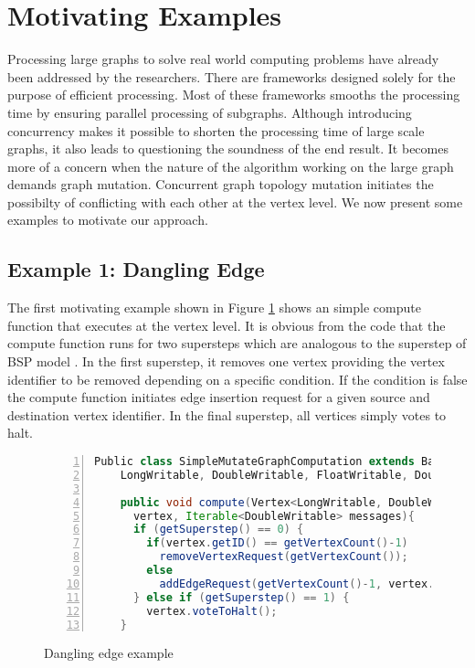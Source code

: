 \section{Motivating Examples}
\label{sec:motivation}

Processing large graphs to solve real world computing problems have already been addressed by the researchers. There are frameworks designed solely for the purpose of efficient processing. Most of these frameworks smooths the processing time by ensuring parallel processing of subgraphs. Although introducing concurrency makes it possible to shorten the processing time of large scale graphs, it also leads to questioning the soundness of the end result. It becomes more of a concern when the nature of the algorithm working on the large graph demands graph mutation. Concurrent graph topology mutation initiates the possibilty of conflicting with each other at the vertex level. We now present some examples to motivate our approach.


\subsection{Example 1: Dangling Edge}
\label{subsec:example1}

The first motivating example shown in Figure \ref{fig:dEdge} shows an simple compute function that executes at the vertex level. It is obvious from the code that the compute function runs for two supersteps which are analogous to the superstep of BSP model \cite{Valiant1990}. In the first superstep, it removes one vertex providing the vertex identifier to be removed depending on a specific condition. If the condition is false the compute function initiates edge insertion request for a given source and destination vertex identifier. In the final superstep, all vertices simply votes to halt.

\begin{figure}[h]
\begin{center}
\begin{lstlisting}[frame=tb, keywordstyle=\color{blue}, backgroundcolor=\color{white}, basicstyle=\footnotesize\ttfamily, language=Java, numbers=left, numberstyle=\tiny\color{black}]
  Public class SimpleMutateGraphComputation extends BasicComputation<
    LongWritable, DoubleWritable, FloatWritable, DoubleWritable> {

    public void compute(Vertex<LongWritable, DoubleWritable, FloatWritable>
      vertex, Iterable<DoubleWritable> messages){
      if (getSuperstep() == 0) {
        if(vertex.getID() == getVertexCount()-1)
          removeVertexRequest(getVertexCount());
        else
          addEdgeRequest(getVertexCount()-1, vertex.getID());
      } else if (getSuperstep() == 1) {
        vertex.voteToHalt();
    }
\end{lstlisting}
\end{center}
\caption{Dangling edge example}
\label{fig:dEdge}
\end{figure}


